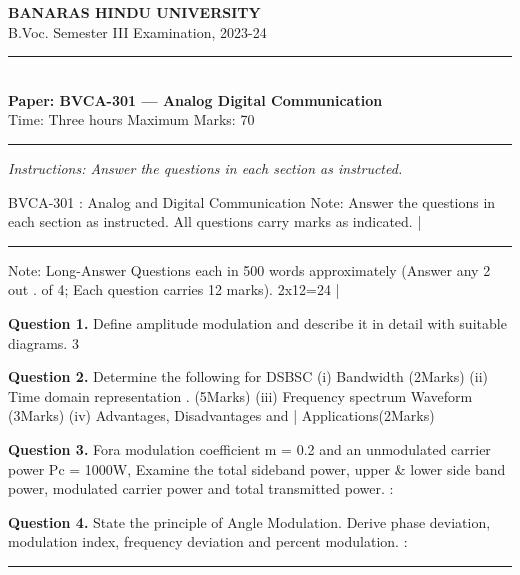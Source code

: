 \documentclass[11pt,a4paper]{article}
\begin{document}
\begin{center}
  {\large\bfseries BANARAS HINDU UNIVERSITY}\\[2pt]
  {\normalsize B.Voc. Semester III Examination, 2023-24}\\[6pt]
  \rule{0.8\linewidth}{0.5pt}\\[6pt]
  {\large\bfseries Paper: BVCA-301 --- Analog Digital Communication}\\[4pt]
  {\normalsize Time: Three hours \hfill Maximum Marks: 70}
\end{center}

\rule{\linewidth}{0.4pt}

\smallskip
\noindent\textit{Instructions: Answer the questions in each section as instructed.}

\bigskip

BVCA-301 : Analog and Digital Communication
Note: Answer the questions in each section as instructed.
All questions carry marks as indicated. |

\bigskip{}
\rule{\linewidth}{0.4pt}\smallskip

Note: Long-Answer Questions each in 500 words approximately (Answer any 2 out .
of 4; Each question carries 12 marks). 2x12=24 |

\medskip\noindent\textbf{Question 1.} Define amplitude modulation and describe it in detail with suitable diagrams. 3

\medskip\noindent\textbf{Question 2.} Determine the following for DSBSC (i) Bandwidth (2Marks) (ii) Time domain representation .
(5Marks) (iii) Frequency spectrum Waveform (3Marks) (iv) Advantages, Disadvantages and |
Applications(2Marks)

\medskip\noindent\textbf{Question 3.} Fora modulation coefficient m = 0.2 and an unmodulated carrier power Pc = 1000W, Examine
the total sideband power, upper \& lower side band power, modulated carrier power and total
transmitted power. :

\medskip\noindent\textbf{Question 4.} State the principle of Angle Modulation. Derive phase deviation, modulation index, frequency
deviation and percent modulation. :

\bigskip{}
\rule{\linewidth}{0.4pt}\smallskip
\end{document}
